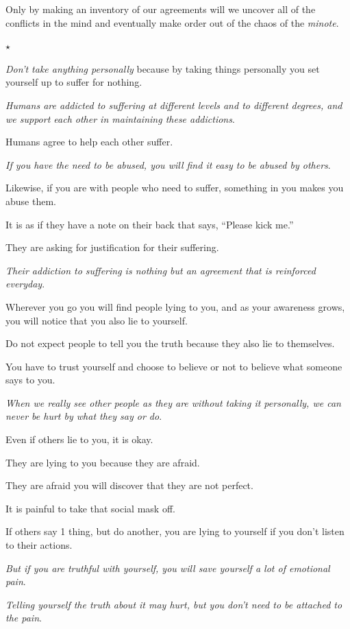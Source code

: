 \documentclass{article}
\numberwithin{equation}{section}
\begin{document}
Only by making an inventory of our agreements will we uncover all of the conflicts in the mind and eventually make order out of the chaos of the \textit{minote}.
\begin{center}
    $\star$
\end{center}

\textit{Don't take anything personally} because by taking things personally you set yourself up to suffer for nothing.

\textit{Humans are addicted to suffering at different levels and to different degrees, and we support each other in maintaining these addictions}.

Humans agree to help each other suffer.

\textit{If you have the need to be abused, you will find it easy to be abused by others}.

Likewise, if you are with people who need to suffer, something in you makes you abuse them.

It is as if they have a note on their back that says, ``Please kick me.''

They are asking for justification for their suffering.

\textit{Their addiction to suffering is nothing but an agreement that is reinforced everyday}.

%
Wherever you go you will find people lying to you, and as your awareness grows, you will notice that you also lie to yourself.

Do not expect people to tell you the truth because they also lie to themselves.

You have to trust yourself and choose to believe or not to believe what someone says to you.

%
\textit{When we really see other people as they are without taking it personally, we can never be hurt by what they say or do}.

Even if others lie to you, it is okay.

They are lying to you because they are afraid.

They are afraid you will discover that they are not perfect.

It is painful to take that social mask off.

If others say 1 thing, but do another, you are lying to yourself if you don't listen to their actions.

\textit{But if you are truthful with yourself, you will save yourself a lot of emotional pain}.

\textit{Telling yourself the truth about it may hurt, but you don't need to be attached to the pain}.
\end{document}
